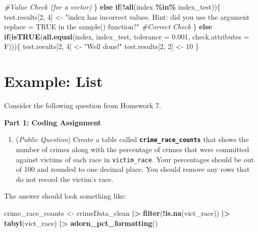 \documentclass[
  12pt,
]{book}
\newenvironment{Shaded}{\begin{snugshade}}{\end{snugshade}}
\newcommand{\AttributeTok}[1]{\textcolor[rgb]{0.13,0.29,0.53}{#1}}
\newcommand{\CommentTok}[1]{\textcolor[rgb]{0.56,0.35,0.01}{\textit{#1}}}
\newcommand{\ControlFlowTok}[1]{\textcolor[rgb]{0.13,0.29,0.53}{\textbf{#1}}}
\newcommand{\DecValTok}[1]{\textcolor[rgb]{0.00,0.00,0.81}{#1}}
\newcommand{\FloatTok}[1]{\textcolor[rgb]{0.00,0.00,0.81}{#1}}
\newcommand{\FunctionTok}[1]{\textcolor[rgb]{0.13,0.29,0.53}{\textbf{#1}}}
\newcommand{\NormalTok}[1]{#1}
\newcommand{\OtherTok}[1]{\textcolor[rgb]{0.56,0.35,0.01}{#1}}
\newcommand{\SpecialCharTok}[1]{\textcolor[rgb]{0.81,0.36,0.00}{\textbf{#1}}}
\newcommand{\StringTok}[1]{\textcolor[rgb]{0.31,0.60,0.02}{#1}}
\providecommand{\tightlist}{%
  \setlength{\itemsep}{0pt}\setlength{\parskip}{0pt}}
\begin{document}
\begin{Shaded}
\begin{Highlighting}[]
\CommentTok{\#Value Check (for a vector)}
\NormalTok{\} }\ControlFlowTok{else} \ControlFlowTok{if}\NormalTok{(}\SpecialCharTok{!}\FunctionTok{all}\NormalTok{(index }\SpecialCharTok{\%in\%}\NormalTok{ index\_test))\{ }
\NormalTok{  test.results[}\DecValTok{2}\NormalTok{, }\DecValTok{4}\NormalTok{] }\OtherTok{\textless{}{-}} \StringTok{"\textasciigrave{}index\textasciigrave{} has incorrect values. Hint: did you use the argument replace = TRUE in the \textasciigrave{}sample()\textasciigrave{} function?"}
\CommentTok{\#Correct Check}
\NormalTok{\} }\ControlFlowTok{else} \ControlFlowTok{if}\NormalTok{(}\FunctionTok{isTRUE}\NormalTok{(}\FunctionTok{all.equal}\NormalTok{(index, index\_test, }
                           \AttributeTok{tolerance =} \FloatTok{0.001}\NormalTok{, }\AttributeTok{check.attributes =}\NormalTok{ F)))\{ }
\NormalTok{  test.results[}\DecValTok{2}\NormalTok{, }\DecValTok{4}\NormalTok{] }\OtherTok{\textless{}{-}} \StringTok{"Well done!"}
\NormalTok{  test.results[}\DecValTok{2}\NormalTok{, }\DecValTok{2}\NormalTok{] }\OtherTok{\textless{}{-}} \DecValTok{10}
\NormalTok{\}}
\end{Highlighting}
\end{Shaded}

\section{Example: List}\label{example-list}

Consider the following question from Homework 7.

\textbf{Part 1: Coding Assignment}

\begin{enumerate}
\def\labelenumi{\arabic{enumi}.}
\setcounter{enumi}{2}
\tightlist
\item
  (\emph{Public Question}) Create a table called \textbf{\texttt{crime\_race\_counts}} that shows the number of crimes along with the percentage of crimes that were committed against victims of each race in \texttt{victim\_race}. Your percentages should be out of 100 and rounded to one decimal place. You should remove any rows that do not record the victim's race.
\end{enumerate}

The answer should look something like:

\begin{Shaded}
\begin{Highlighting}[]
\NormalTok{crime\_race\_counts }\OtherTok{\textless{}{-}}\NormalTok{ crimeData\_clean }\SpecialCharTok{|\textgreater{}} 
  \FunctionTok{filter}\NormalTok{(}\SpecialCharTok{!}\FunctionTok{is.na}\NormalTok{(vict\_race)) }\SpecialCharTok{|\textgreater{}} 
  \FunctionTok{tabyl}\NormalTok{(vict\_race) }\SpecialCharTok{|\textgreater{}}
  \FunctionTok{adorn\_pct\_formatting}\NormalTok{()}
\end{Highlighting}
\end{Shaded}
\end{document}
